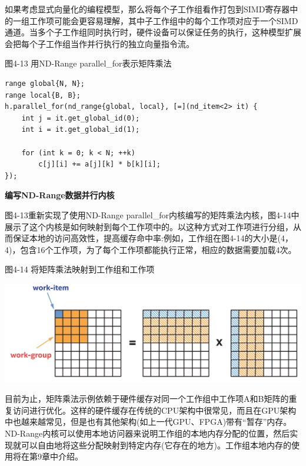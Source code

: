 \begin{tcolorbox}[colback=blue!5!white,colframe=blue!75!black, title=对于子工作组的思考]
如果考虑显式向量化的编程模型，那么将每个子工作组看作打包到SIMD寄存器中的一组工作项可能会更容易理解，其中子工作组中的每个工作项对应于一个SIMD通道。当多个子工作组同时执行时，硬件设备可以保证任务的执行，这种模型扩展会把每个子工作组当作并行执行的独立向量指令流。
\end{tcolorbox}

\hspace*{\fill} \par %
图4-13 用ND-Range parallel\_for表示矩阵乘法
\begin{lstlisting}[caption={}]
range global{N, N};
range local{B, B};
h.parallel_for(nd_range{global, local}, [=](nd_item<2> it) {
	int j = it.get_global_id(0);
	int i = it.get_global_id(1);
	
	for (int k = 0; k < N; ++k)
		c[j][i] += a[j][k] * b[k][i];
});
\end{lstlisting}

\hspace*{\fill} \par %
\textbf{编写ND-Range数据并行内核}

图4-13重新实现了使用ND-Range parallel\_for内核编写的矩阵乘法内核，图4-14中展示了这个内核是如何映射到每个工作项中的。以这种方式对工作项进行分组，从而保证本地的访问高效性，提高缓存命中率:例如，工作组在图4-14的大小是(4，4)，包含16个工作项，为了每个工作项都能执行正常，相应的数据需要加载4次。\par

\hspace*{\fill} \par %
图4-14 将矩阵乘法映射到工作组和工作项
\begin{center}
	\includegraphics[width=1.\textwidth]{content/chapter-4/images/8}
\end{center}

目前为止，矩阵乘法示例依赖于硬件缓存对同一个工作组中工作项A和B矩阵的重复访问进行优化。这样的硬件缓存在传统的CPU架构中很常见，而且在GPU架构中也越来越常见，但是也有其他架构(如上一代GPU、FPGA)带有“暂存”内存。ND-Range内核可以使用本地访问器来说明工作组的本地内存分配的位置，然后实现就可以自由地将这些分配映射到特定内存(它存在的地方)。工作组本地内存的使用将在第9章中介绍。\par

